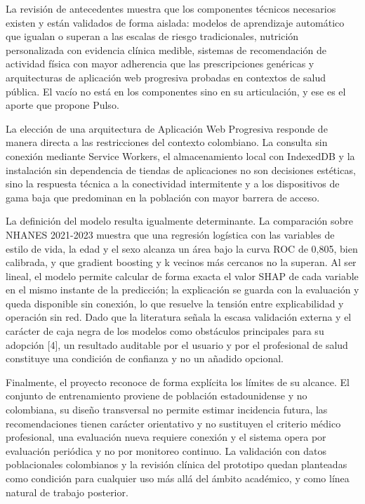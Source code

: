 \documentclass[conference]{IEEEtran}
\begin{document}
La revisión de antecedentes muestra que los componentes técnicos necesarios existen y están validados de forma aislada: modelos de aprendizaje automático que igualan o superan a las escalas de riesgo tradicionales, nutrición personalizada con evidencia clínica medible, sistemas de recomendación de actividad física con mayor adherencia que las prescripciones genéricas y arquitecturas de aplicación web progresiva probadas en contextos de salud pública. El vacío no está en los componentes sino en su articulación, y ese es el aporte que propone Pulso.

La elección de una arquitectura de Aplicación Web Progresiva responde de manera directa a las restricciones del contexto colombiano. La consulta sin conexión mediante Service Workers, el almacenamiento local con IndexedDB y la instalación sin dependencia de tiendas de aplicaciones no son decisiones estéticas, sino la respuesta técnica a la conectividad intermitente y a los dispositivos de gama baja que predominan en la población con mayor barrera de acceso.

La definición del modelo resulta igualmente determinante. La comparación sobre NHANES 2021-2023 muestra que una regresión logística con las variables de estilo de vida, la edad y el sexo alcanza un área bajo la curva ROC de 0{,}805, bien calibrada, y que gradient boosting y k vecinos más cercanos no la superan. Al ser lineal, el modelo permite calcular de forma exacta el valor SHAP de cada variable en el mismo instante de la predicción; la explicación se guarda con la evaluación y queda disponible sin conexión, lo que resuelve la tensión entre explicabilidad y operación sin red. Dado que la literatura señala la escasa validación externa y el carácter de caja negra de los modelos como obstáculos principales para su adopción [4], un resultado auditable por el usuario y por el profesional de salud constituye una condición de confianza y no un añadido opcional.

Finalmente, el proyecto reconoce de forma explícita los límites de su alcance. El conjunto de entrenamiento proviene de población estadounidense y no colombiana, su diseño transversal no permite estimar incidencia futura, las recomendaciones tienen carácter orientativo y no sustituyen el criterio médico profesional, una evaluación nueva requiere conexión y el sistema opera por evaluación periódica y no por monitoreo continuo. La validación con datos poblacionales colombianos y la revisión clínica del prototipo quedan planteadas como condición para cualquier uso más allá del ámbito académico, y como línea natural de trabajo posterior.
\end{document}
